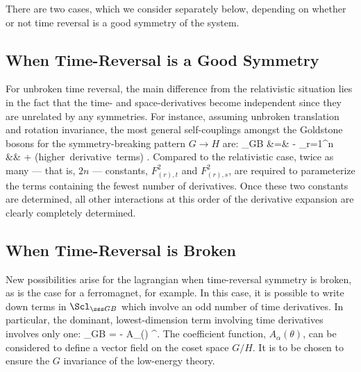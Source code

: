 \documentclass[12pt]{report}
\begin{document}
There are two cases, which we consider separately below,
depending on whether or not time reversal is a good 
symmetry of the system. 

\subsection{When Time-Reversal is a Good Symmetry}

For unbroken time reversal, the main difference from the
relativistic situation lies in the fact that the time- and
space-derivatives become independent since they are
unrelated by any symmetries. For instance, assuming
unbroken translation and rotation invariance, the most
general self-couplings amongst the Goldstone bosons for the
symmetry-breaking pattern $G \to H$ are:
%
\bg
\label{genlowdtermnr}
\Scl_{\sss GB} &=& - \hf \sum_{r=1}^n  \nn\\ && \qquad \qquad 
\qquad + \hbox{(higher
derivative terms)} .
\nd
%
Compared to the relativistic case, twice as many --- that
is, $2n$ --- constants, $F_{(r),t}^2$ and $F_{(r),s}^2$,
are required to parameterize the terms containing the
fewest number of derivatives. Once these two constants are
determined, all other interactions at this order of the
derivative expansion are clearly completely determined.

\subsection{When Time-Reversal is Broken}

New possibilities arise for the lagrangian when
time-reversal symmetry is broken, as is the case for a
ferromagnet, for example. In this case, it is possible to
write down terms in $\Scl_{\sss GB}$ which involve an odd
number of time derivatives. In particular, the dominant,
lowest-dimension term involving time derivatives involves
only one:
%
\eq
\label{tvterm}
\Delta \Scl_{\sss GB} = - A_\alpha(\theta) \; \dot
\theta^\alpha.
\eeq
%
The coefficient function, $A_\alpha(\theta)$, can be
considered to define a vector field on the coset space
$G/H$. It is to be chosen to ensure the $G$ invariance of
the low-energy theory.
\end{document}
